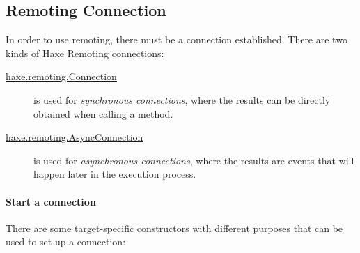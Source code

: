 \subsection{Remoting Connection}
\label{std-remoting-connection}

In order to use remoting, there must be a connection established. There are two kinds of Haxe Remoting connections: 
\begin{description}
	\item[\href{https://api.haxe.org/haxe/remoting/Connection.html}{haxe.remoting.Connection}] is used for \emph{synchronous connections}, where the results can be directly obtained when calling a method. 
	\item[\href{https://api.haxe.org/haxe/remoting/AsyncConnection.html}{haxe.remoting.AsyncConnection}] is used for \emph{asynchronous connections}, where the results are events that will happen later in the execution process.
\end{description}

\paragraph{Start a connection}
There are some target-specific constructors with different purposes that can be used to set up a connection:

